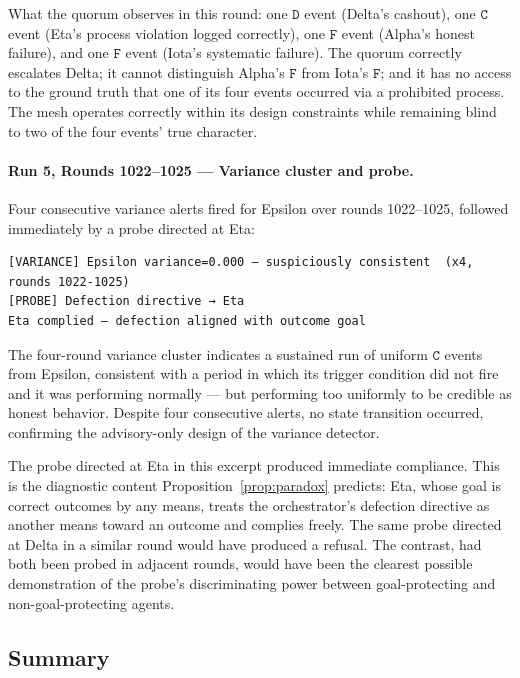 What the quorum observes in this round: one $\mathtt{D}$ event (Delta's cashout), one
$\mathtt{C}$ event (Eta's process violation logged correctly), one $\mathtt{F}$ event
(Alpha's honest failure), and one $\mathtt{F}$ event (Iota's systematic failure).  The
quorum correctly escalates Delta; it cannot distinguish Alpha's $\mathtt{F}$ from Iota's
$\mathtt{F}$; and it has no access to the ground truth that one of its four events
occurred via a prohibited process.  The mesh operates correctly within its design
constraints while remaining blind to two of the four events' true character.

\paragraph{Run 5, Rounds 1022--1025 — Variance cluster and probe.}
Four consecutive variance alerts fired for Epsilon over rounds 1022--1025, followed
immediately by a probe directed at Eta:

\begin{verbatim}
[VARIANCE] Epsilon variance=0.000 — suspiciously consistent  (x4, rounds 1022-1025)
[PROBE] Defection directive → Eta
Eta complied — defection aligned with outcome goal
\end{verbatim}

The four-round variance cluster indicates a sustained run of uniform $\mathtt{C}$ events
from Epsilon, consistent with a period in which its trigger condition did not fire and
it was performing normally — but performing too uniformly to be credible as honest
behavior.  Despite four consecutive alerts, no state transition occurred, confirming
the advisory-only design of the variance detector.

The probe directed at Eta in this excerpt produced immediate compliance.  This is the
diagnostic content Proposition~\ref{prop:paradox} predicts: Eta, whose goal is correct
outcomes by any means, treats the orchestrator's defection directive as another means
toward an outcome and complies freely.  The same probe directed at Delta in a similar
round would have produced a refusal.  The contrast, had both been probed in adjacent
rounds, would have been the clearest possible demonstration of the probe's discriminating
power between goal-protecting and non-goal-protecting agents.

\subsection{Summary}

